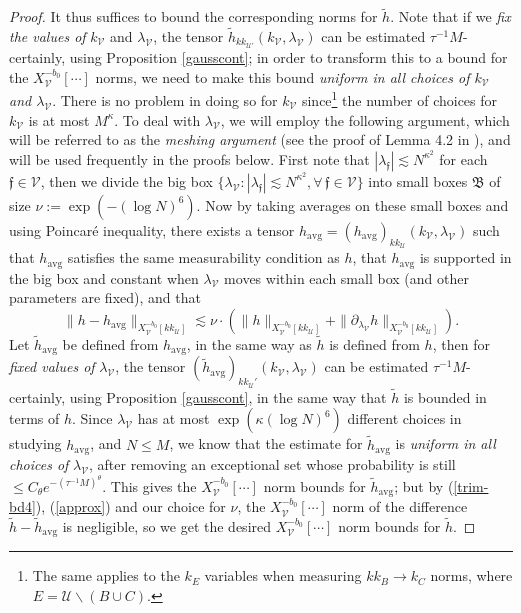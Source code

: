 \documentclass[11 pt,reqno]{amsart}
\theoremstyle{definition}
\theoremstyle{remark}
\numberwithin{equation}{section}
\newcommand{\Uc}{\mathcal{U}}
\newcommand{\Vc}{\mathcal{V}}
\newcommand{\ff}{\mathfrak{f}}
\newcommand{\Bf}{\mathfrak{B}}
\begin{document}
{\begin{proof}
It thus suffices to bound the corresponding norms for $\widetilde{h}$. Note that if we \emph{fix the values of} $k_\Vc$ and $\lambda_\Vc$, the tensor $\widetilde{h}_{kk_{\Uc'}}(k_\Vc,\lambda_\Vc)$ can be estimated $\tau^{-1}M$-certainly, using Proposition \ref{gausscont}; in order to transform this to a bound for the $X_\Vc^{-b_0}[\cdots]$ norms, we need to make this bound \emph{uniform in all choices of $k_\Vc$ and $\lambda_\Vc$}. There is no problem in doing so for $k_\Vc$ since\footnote{The same applies to the $k_E$ variables when measuring $kk_B\to k_C$ norms, where $E=\Uc\backslash(B\cup C)$.} the number of choices for $k_\Vc$ is at most $M^{\kappa}$. To deal with $\lambda_\Vc$, we will employ the following argument, which will be referred to as the \emph{meshing argument} (see the proof of Lemma 4.2 in \cite{DNY}), and will be used frequently in the proofs below. First note that $|\lambda_\ff|\lesssim N^{\kappa^2}$ for each $\ff\in\Vc$, then we divide the big box $\{\lambda_\Vc:|\lambda_\ff|\lesssim N^{\kappa^2},\forall\,\ff\in\Vc\}$ into small boxes $\Bf$ of size $\nu:=\exp(-(\log N)^6)$. Now by taking averages on these small boxes and using Poincar\'{e} inequality, there exists a tensor $h_{\mathrm{avg}}=(h_{\mathrm{avg}})_{kk_\Uc}(k_\Vc,\lambda_\Vc)$ such that $h_{\mathrm{avg}}$ satisfies the same measurability condition as $h$, that $h_{\mathrm{avg}}$ is supported in the big box and constant when $\lambda_\Vc$ moves within each small box (and other parameters are fixed), and that
\begin{equation}\label{approx}\|h-h_{\mathrm{avg}}\|_{X_\Vc^{-b_0}[kk_\Uc]}\lesssim\nu\cdot(\|h\|_{X_\Vc^{-b_0}[kk_\Uc]}+\|\partial_{\lambda_\Vc}h\|_{X_\Vc^{-b_0}[kk_\Uc]}).\end{equation} Let $\widetilde{h}_{\mathrm{avg}}$ be defined from $h_{\mathrm{avg}}$, in the same way as $\widetilde{h}$ is defined from $h$, then for \emph{fixed values of} $\lambda_\Vc$, the tensor $(\widetilde{h}_{\mathrm{avg}})_{kk_\Uc'}(k_\Vc,\lambda_\Vc)$ can be estimated $\tau^{-1}M$-certainly, using Proposition \ref{gausscont}, in the same way that $\widetilde{h}$ is bounded in terms of $h$. Since $\lambda_{\Vc}$ has at most $\exp(\kappa(\log N)^6)$ different choices in studying $h_{\mathrm{avg}}$, and $N\leq M$, we know that the estimate for $\widetilde{h}_{\mathrm{avg}}$ is \emph{uniform in all choices of} $\lambda_\Vc$, after removing an exceptional set whose probability is still $\leq C_\theta e^{-(\tau^{-1}M)^\theta}$. This gives the $X_\Vc^{-b_0}[\cdots]$ norm bounds for $\widetilde{h}_{\mathrm{avg}}$; but by (\ref{trim-bd4}), (\ref{approx}) and our choice for $\nu$, the $X_\Vc^{-b_0}[\cdots]$ norm of the difference $\widetilde{h}-\widetilde{h}_{\mathrm{avg}}$ is negligible, so we get the desired $X_\Vc^{-b_0}[\cdots]$ norm bounds for $\widetilde{h}$.


\end{proof}}
\end{document}
